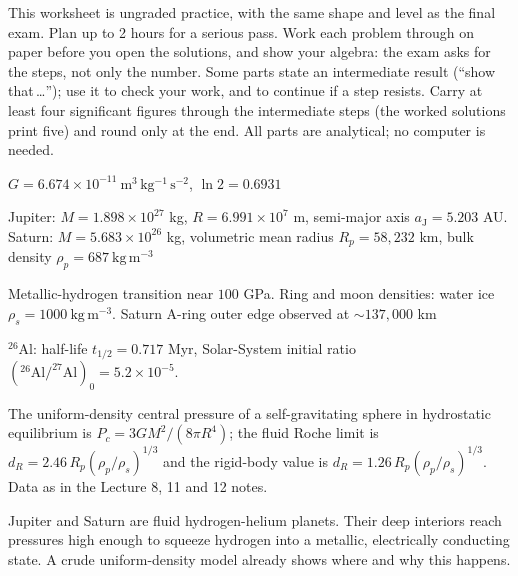 
\ipsmaketitle

This worksheet is ungraded practice, with the same shape and level as the final exam.
Plan up to 2 hours for a serious pass.
Work each problem through on paper before you open the solutions, and show your algebra:
the exam asks for the steps, not only the number.
Some parts state an intermediate result (``show that\,\ldots''); use it to check your work, and to continue if a step resists.
Carry at least four significant figures through the intermediate steps (the worked solutions print five) and round only at the end.
All parts are analytical; no computer is needed.

\begin{given}
$G = 6.674 \times 10^{-11}\ \mathrm{m^3\,kg^{-1}\,s^{-2}}$,\quad
$\ln 2 = 0.6931$

\vskip4pt
Jupiter: $M = 1.898 \times 10^{27}$ kg, $R = 6.991 \times 10^{7}$ m, semi-major axis $a_\mathrm{J} = 5.203$ AU.\quad
Saturn: $M = 5.683 \times 10^{26}$ kg, volumetric mean radius $R_p = 58{,}232$ km, bulk density $\rho_p = 687\ \mathrm{kg\,m^{-3}}$

\vskip4pt
Metallic-hydrogen transition near $100$ GPa. Ring and moon densities: water ice $\rho_s = 1000\ \mathrm{kg\,m^{-3}}$. Saturn A-ring outer edge observed at $\sim 137{,}000$ km

\vskip4pt
$^{26}$Al: half-life $t_{1/2} = 0.717$ Myr, Solar-System initial ratio $(^{26}\mathrm{Al}/^{27}\mathrm{Al})_0 = 5.2 \times 10^{-5}$.


\vskip4pt
{\footnotesize The uniform-density central pressure of a self-gravitating sphere in hydrostatic equilibrium is $P_c = 3GM^2/(8\pi R^4)$; the fluid Roche limit is $d_R = 2.46\,R_p(\rho_p/\rho_s)^{1/3}$ and the rigid-body value is $d_R = 1.26\,R_p(\rho_p/\rho_s)^{1/3}$. Data as in the Lecture 8, 11 and 12 notes.}
\end{given}



Jupiter and Saturn are fluid hydrogen-helium planets.
Their deep interiors reach pressures high enough to squeeze hydrogen into a metallic, electrically conducting state.
A crude uniform-density model already shows where and why this happens.


